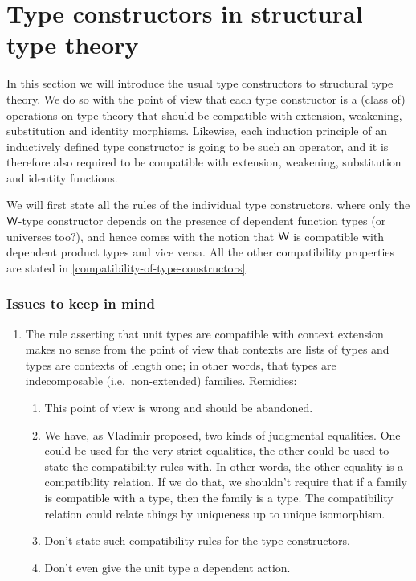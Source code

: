\section{Type constructors in structural type theory}
In this section we will introduce the usual type constructors to structural
type theory. We do so with the point of view that each type constructor is a
(class of) operations on type theory that should be compatible with extension,
weakening, substitution and identity morphisms. Likewise, each induction
principle of an inductively defined type constructor is going to be such an
operator, and it is therefore also required to be compatible with extension,
weakening, substitution and identity functions.

We will first state all the rules of the individual type constructors, where
only the ${\mathsf{W}}$-type constructor depends on the presence of dependent
function types (or universes too?), and hence comes with the notion that ${\mathsf{W}}$
is compatible with dependent product types and vice versa. All the other
compatibility properties are stated in \autoref{compatibility-of-type-constructors}.

\subsubsection{Issues to keep in mind}
\begin{enumerate}
\item The rule asserting that unit types are compatible with context extension makes
no sense from the point of view that contexts are lists of types and types
are contexts of length one; in other words, that types are indecomposable (i.e.~non-extended)
families. Remidies:
\begin{enumerate}
\item This point of view is wrong and should be abandoned.
\item We have, as Vladimir proposed, two kinds of judgmental equalities. One
      could be used for the very strict equalities, the other could be used
      to state the compatibility rules with. In other words, the other equality
      is a compatibility relation. If we do that, we shouldn't require that
      if a family is compatible with a type, then the family is a type. The
      compatibility relation could relate things by uniqueness up to unique
      isomorphism.
\item Don't state such compatibility rules for the type constructors.
\item Don't even give the unit type a dependent action.
\end{enumerate}
\end{enumerate}

